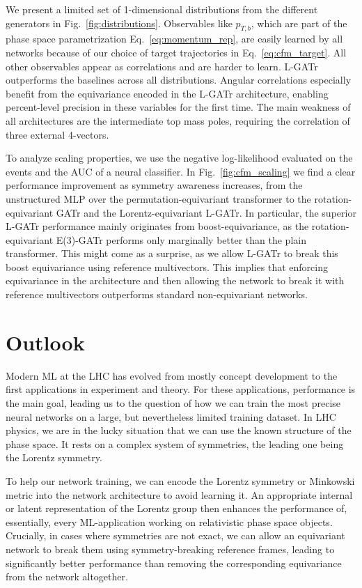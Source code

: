 \documentclass[submission, Phys]{SciPost}
\begin{document}
We present a limited set of 1-dimensional distributions from the different generators in Fig.~\ref{fig:distributions}. Observables like $p_{T,b}$, which are part of the phase space parametrization Eq.~\eqref{eq:momentum_rep}, are easily learned by all networks because of our choice of target trajectories in Eq.~\eqref{eq:cfm_target}. All other observables appear as correlations and are harder to learn. L-GATr outperforms the baselines across all distributions. Angular correlations especially benefit from the equivariance encoded in the L-GATr architecture, enabling percent-level precision in these variables for the first time. The main weakness of all architectures are the intermediate top mass poles, requiring the correlation of three external 4-vectors.

To analyze scaling properties, we use the negative log-likelihood evaluated on the events and the AUC of a neural classifier. In Fig.~\ref{fig:cfm_scaling} we find a clear performance improvement as symmetry awareness increases, from the unstructured MLP over the permutation-equivariant transformer to the rotation-equivariant GATr and the Lorentz-equivariant L-GATr. In particular, the superior L-GATr performance mainly originates from boost-equivariance, as the rotation-equivariant E(3)-GATr performs only marginally better than the plain transformer. This might come as a surprise, as we allow L-GATr to break this boost equivariance using reference multivectors. This implies that enforcing equivariance in the architecture and then allowing the network to break it with reference multivectors outperforms standard non-equivariant networks.

\section{Outlook}
\label{sec:outlook}

Modern ML at the LHC has evolved from mostly concept development to the first applications in experiment and theory. For these applications, performance is the main goal, leading us to the question of how we can train the most precise neural networks on a large, but nevertheless limited training dataset. In LHC physics, we are in the lucky situation that we can use the known structure of the phase space. It rests on a complex system of symmetries, the leading one being the Lorentz symmetry.

To help our network training, we can encode the Lorentz symmetry or Minkowski metric into the network architecture to avoid learning it. An appropriate internal or latent representation of the Lorentz group then enhances the performance of, essentially, every ML-application working on relativistic phase space objects. Crucially, in cases where symmetries are not exact, we can allow an equivariant network to break them using symmetry-breaking reference frames, leading to significantly better performance than removing the corresponding equivariance from the network altogether.
\end{document}
